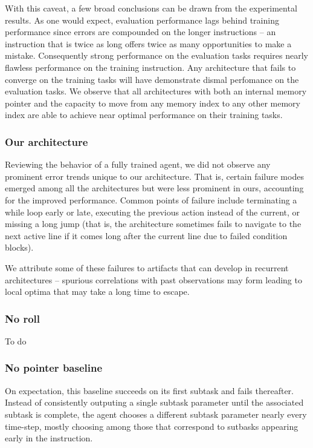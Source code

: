 \documentclass{article}
\begin{document}
With this caveat, a few broad conclusions can be drawn from the experimental
results. As one would expect, evaluation performance lags behind training
performance since errors are compounded on the longer instructions -- an
instruction that is twice as long offers twice as many opportunities to make a
mistake. Consequently strong performance on the evaluation tasks requires
nearly flawless performance on the training instruction. Any architecture that fails to
converge on the training tasks will have demonstrate dismal perfomance on the
evaluation tasks.  We observe that all architectures with both an internal memory pointer and the
capacity to move from any memory index to any other memory index are able to
achieve near optimal performance on their training tasks. 

\subsubsection{Our architecture}
Reviewing the behavior of a fully trained agent, we did not observe any
prominent error trends unique to our architecture. That is, certain failure
modes emerged among all the architectures but were less prominent in ours,
accounting for the improved performance. Common points of failure include
terminating a while loop early or late, executing the previous action instead of
the current, or missing a long jump (that is, the architecture sometimes fails
to navigate to the next active line if it comes long after the current line due
to failed condition blocks).

We attribute some of these failures to artifacts that can develop in recurrent
architectures -- spurious correlations with past observations may form leading
to local optima that may take a long time to escape.

\subsubsection{No roll}
To do


\subsubsection{No pointer baseline}
On expectation, this baseline succeeds on its first subtask and fails
thereafter. Instead of consistently outputing a single subtask parameter until
the associated subtask is complete, the agent chooses a different subtask
parameter nearly every time-step, mostly choosing among those that correspond to
sutbasks appearing early in the instruction.
\end{document}
